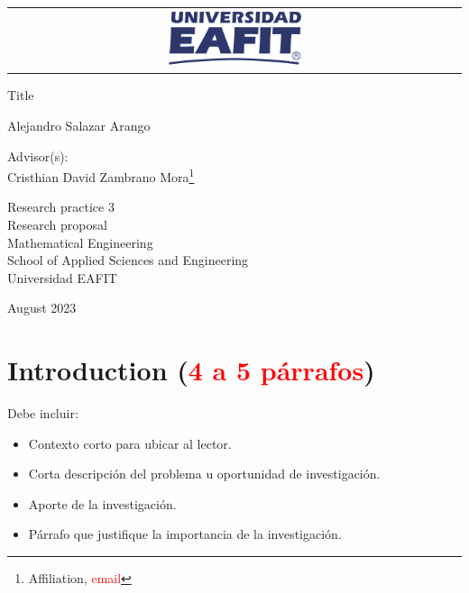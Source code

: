 \documentclass[12pt,letterpaper]{article}
\begin{document}
\begin{titlepage}

\Large
\sffamily

\begin{center}
  \begin{tabular}{c}
    \includegraphics[width=0.30\textwidth]{logo-eafit.png}
  \end{tabular}
\end{center}

\vfill
\begin{center}
  \LARGE Title
\end{center}

\vspace*{1cm}
\centerline{\LARGE Alejandro Salazar Arango\footnotemark}  
\vfill

\begin{center}
Advisor(s): \\
Cristhian David Zambrano Mora\footnote{Affiliation, \textcolor{red}{email}}   \\
\end{center}

\vfill

\begin{center}
  \large
    Research practice 3 \\
  Research proposal \\
  Mathematical Engineering\\
  School of Applied Sciences and Engineering\\
  Universidad EAFIT \\
\end{center}

\vfill
\centerline{August 2023}
\vspace*{0.7cm}
\end{titlepage}


\section{Introduction (\textcolor{red}{4 a 5 párrafos})}

Debe incluir:

\begin{itemize}
\item Contexto corto para ubicar al lector.
\item Corta descripción del problema u oportunidad de investigación.
\item Aporte de la investigación.
\item Párrafo que justifique la importancia de la investigación.
\end{itemize}
\end{document}
